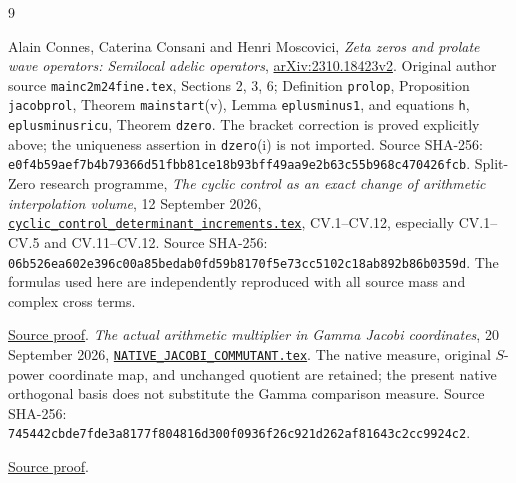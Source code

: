 \documentclass[11pt]{article}
\begin{document}
\begin{thebibliography}{9}\raggedright
{} Alain Connes, Caterina Consani and Henri Moscovici,
\emph{Zeta zeros and prolate wave operators: Semilocal adelic operators},
\href{https://arxiv.org/abs/2310.18423v2}{arXiv:2310.18423v2}.
Original author source \texttt{mainc2m24fine.tex}, Sections 2, 3, 6;
Definition \texttt{prolop}, Proposition \texttt{jacobprol},
Theorem \texttt{mainstart}(v), Lemma \texttt{eplusminus1},
and equations \texttt{h}, \texttt{eplusminusricu}, Theorem
\texttt{dzero}. The bracket correction is proved explicitly
above; the uniqueness assertion in \texttt{dzero}(i) is not
imported. Source SHA-256:
\texttt{e0f4b59aef7b4b79366d51fbb81ce18b93bff49aa9e2b63c55b968c470426fcb}.
 Split-Zero research programme,
\emph{The cyclic control as an exact change of arithmetic
interpolation volume}, 12 September 2026,
\href{https://github.com/KokunoYumeto/zeta-function-research-reader/blob/487253b5b01851da5b9b98af4e146fecf1fab902/workbenches/splitzero-tandem/continuations/20260913-toda/tex/cyclic_control_determinant_increments.tex\#L1}{\texttt{cyclic\_control\_determinant\_increments.tex}},
CV.1--CV.12, especially CV.1--CV.5 and CV.11--CV.12.
Source SHA-256:
\texttt{06b526ea602e396c00a85bedab0fd59b8170f5e73cc5102c18ab892b86b0359d}.
The formulas used here are independently reproduced
with all source mass and complex cross terms.

\href{https://github.com/KokunoYumeto/zeta-function-research-reader/blob/487253b5b01851da5b9b98af4e146fecf1fab902/workbenches/splitzero-tandem/continuations/20260913-toda/tex/cyclic_control_determinant_increments.tex\#L1}{Source proof}.
 \emph{The actual arithmetic multiplier in
Gamma Jacobi coordinates}, 20 September 2026,
\href{https://github.com/KokunoYumeto/zeta-function-research-reader/blob/5992ad50c0f2a06921f1fcaded7b4e38097c0739/workbenches/splitzero-tandem/continuations/20260920-original-kernel-mixed-determinants/providers/NATIVE_JACOBI_COMMUTANT.tex\#L1}{\texttt{NATIVE\_JACOBI\_COMMUTANT.tex}}. The native measure,
original $S$-power coordinate map, and unchanged quotient
are retained; the present native orthogonal basis does
not substitute the Gamma comparison measure.
Source SHA-256:
\texttt{745442cbde7fde3a8177f804816d300f0936f26c921d262af81643c2cc9924c2}.

\href{https://github.com/KokunoYumeto/zeta-function-research-reader/blob/5992ad50c0f2a06921f1fcaded7b4e38097c0739/workbenches/splitzero-tandem/continuations/20260920-original-kernel-mixed-determinants/providers/NATIVE_JACOBI_COMMUTANT.tex\#L1}{Source proof}.
\end{thebibliography}
\end{document}
